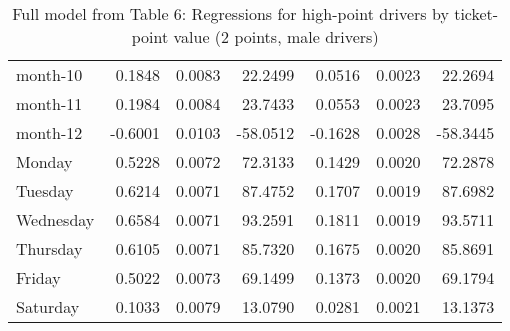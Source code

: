 \documentclass[10pt]{article}
\begin{document}
\begin{table}[ht]
\begin{tabular}{lrrrrrr}
  month-10 & 0.1848 & 0.0083 & 22.2499 & 0.0516 & 0.0023 & 22.2694 \\ 
  month-11 & 0.1984 & 0.0084 & 23.7433 & 0.0553 & 0.0023 & 23.7095 \\ 
  month-12 & -0.6001 & 0.0103 & -58.0512 & -0.1628 & 0.0028 & -58.3445 \\ 
  Monday & 0.5228 & 0.0072 & 72.3133 & 0.1429 & 0.0020 & 72.2878 \\ 
  Tuesday & 0.6214 & 0.0071 & 87.4752 & 0.1707 & 0.0019 & 87.6982 \\ 
  Wednesday & 0.6584 & 0.0071 & 93.2591 & 0.1811 & 0.0019 & 93.5711 \\ 
  Thursday & 0.6105 & 0.0071 & 85.7320 & 0.1675 & 0.0020 & 85.8691 \\ 
  Friday & 0.5022 & 0.0073 & 69.1499 & 0.1373 & 0.0020 & 69.1794 \\ 
  Saturday & 0.1033 & 0.0079 & 13.0790 & 0.0281 & 0.0021 & 13.1373 \\ 
   \hline
\end{tabular}
\caption{Full model from Table 6: Regressions for high-point drivers by ticket-point value (2 points, male drivers)} 
\label{tab_6_2_pts_no_age_M}
\end{table}


\clearpage
\pagebreak



\end{document}
